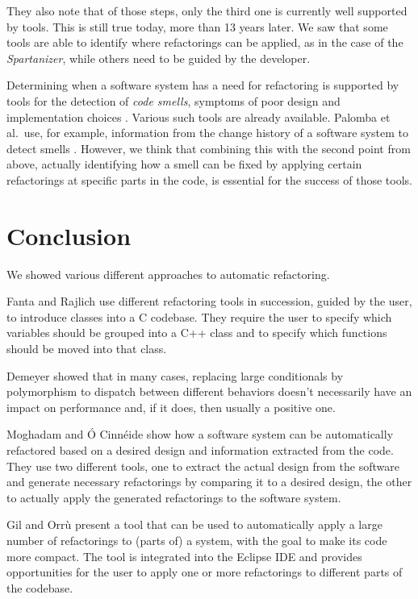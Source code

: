 \documentclass[conference,compsoc,a4paper]{IEEEtran}
\begin{document}
They also note that of those steps, only the third one is currently well supported by tools. This is still true today, 
more than 13 years later. We saw that some tools are able to identify where refactorings can be applied, as in the case 
of the \emph{Spartanizer}, while others need to be guided by the developer.

Determining when a software system has a need for refactoring is supported by tools for the detection of \emph{code 
smells}, symptoms of poor design and implementation choices \cite{DBLP:books/daglib/0019908}. Various such tools are 
already available. Palomba et al.\ use, for example, information from the change history of a software system to detect 
smells \cite{DBLP:conf/kbse/PalombaBPOLP13}.
However, we think that combining this with the second point from above, actually identifying how a smell can be fixed 
by applying certain refactorings at specific parts in the code, is essential for the success of those tools.


\section{Conclusion}

We showed various different approaches to automatic refactoring.

Fanta and Rajlich \cite{cpp} use different refactoring tools in succession, guided by the user, to introduce classes 
into a C codebase. They require the user to specify which variables should be grouped into a C++ class and to specify 
which functions should be moved into that class.

Demeyer \cite{polymorphism} showed that in many cases, replacing large conditionals by polymorphism to dispatch between 
different behaviors doesn't necessarily have an impact on performance and, if it does, then usually a positive one.

Moghadam and Ó Cinnéide \cite{design-diff} show how a software system can be automatically refactored based on a 
desired design and information extracted from the code. They use two different tools, one to extract the actual design 
from the software and generate necessary refactorings by comparing it to a desired design, the other to actually apply 
the generated refactorings to the software system.

Gil and Orrù \cite{sparta} present a tool that can be used to automatically apply a large number of refactorings to 
(parts of) a system, with the goal to make its code more compact. The tool is integrated into the Eclipse IDE and 
provides opportunities for the user to apply one  or more refactorings to different parts of the codebase.
\end{document}
